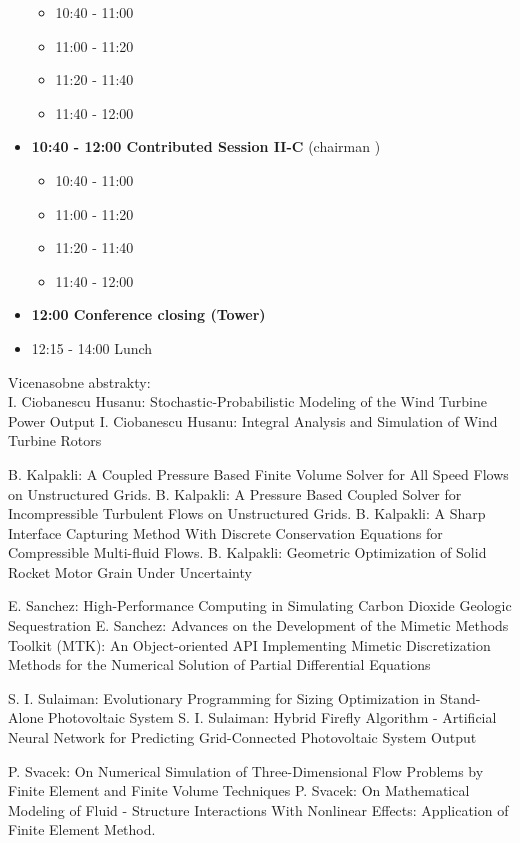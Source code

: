 \documentclass[10pt, A4]{article}%
\begin{document}
\begin{itemize}
\begin{itemize}
    \item 10:40 - 11:00 
    \item 11:00 - 11:20 
    \item 11:20 - 11:40 
    \item 11:40 - 12:00  
  \end{itemize}
  \item {\bf 10:40 - 12:00 Contributed Session II-C} (chairman ) 
  \begin{itemize}
    \item 10:40 - 11:00 
    \item 11:00 - 11:20 
    \item 11:20 - 11:40 
    \item 11:40 - 12:00 
  \end{itemize}
  \item {\bf 12:00 Conference closing (Tower)}
  \item 12:15 - 14:00 Lunch
\newpage
\end{itemize}



\newpage
Vicenasobne abstrakty:\\
{I. Ciobanescu Husanu}: {Stochastic-Probabilistic Modeling of the Wind Turbine Power Output}
{I. Ciobanescu Husanu}: {Integral Analysis and Simulation of Wind Turbine Rotors}

{B. Kalpakli}: {A Coupled Pressure Based Finite Volume Solver for All Speed Flows on Unstructured Grids.}
{B. Kalpakli}: {A Pressure Based Coupled Solver for Incompressible Turbulent Flows on Unstructured Grids.}
{B. Kalpakli}: {A Sharp Interface Capturing Method With Discrete Conservation Equations for Compressible Multi-fluid Flows.}
{B. Kalpakli}: {Geometric Optimization of Solid Rocket Motor Grain Under Uncertainty}

{E. Sanchez}: {High-Performance Computing in Simulating Carbon Dioxide Geologic Sequestration}
{E. Sanchez}: {Advances on the Development of the Mimetic Methods Toolkit (MTK): An Object-oriented API Implementing Mimetic Discretization Methods for the Numerical Solution of Partial Differential Equations}

{S. I. Sulaiman}: {Evolutionary Programming for Sizing Optimization in Stand-Alone Photovoltaic System}
{S. I. Sulaiman}: {Hybrid Firefly Algorithm - Artificial Neural Network for Predicting Grid-Connected Photovoltaic System Output}

{P. Svacek}: {On Numerical Simulation of Three-Dimensional Flow Problems by Finite Element and Finite Volume Techniques}
{P. Svacek}: {On Mathematical Modeling of Fluid - Structure Interactions With Nonlinear Effects: Application of Finite Element Method.}
\end{document}

